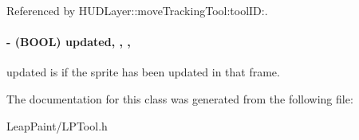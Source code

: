 Referenced by H\-U\-D\-Layer\-::move\-Tracking\-Tool\-:tool\-I\-D\-:.

\hypertarget{interface_l_p_tool_a25dbad647c537177b138bdbbb01936e4}{
\paragraph[{updated}]{\setlength{\rightskip}{0pt plus 5cm}-\/ (B\-O\-O\-L) updated\hspace{0.3cm}{\ttfamily [read]}, {\ttfamily [write]}, {\ttfamily [nonatomic]}, {\ttfamily [assign]}}}\label{d3/d2e/interface_l_p_tool_a25dbad647c537177b138bdbbb01936e4}
updated is if the sprite has been updated in that frame. 

The documentation for this class was generated from the following file\-:\begin{DoxyCompactItemize}
\item 
Leap\-Paint/L\-P\-Tool.\-h\end{DoxyCompactItemize}
